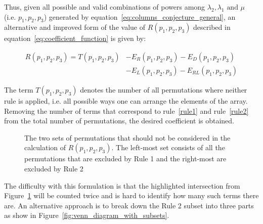 Thus, given all possible and valid combinations of powers among \(\lambda_2,
\lambda_1 \text{ and } \mu\) (i.e. \(p_1,p_2,p_3\)) generated by
equation~\eqref{eq:columns_conjecture_general}, an alternative and improved form
of the value of \(R(p_1, p_2, p_3)\) described in
equation~\eqref{eq:coefficient_function} is given by:

\begin{align}\label{eq:permutation formula}
    R(p_1, p_2, p_3) = T(p_1, p_2, p_3) & - E_R(p_1, p_2, p_3)
    - E_D(p_1, p_2, p_3) \nonumber \\
    & - E_L(p_1, p_2, p_3) - E_{RL}(p_1, p_2, p_3)
\end{align}


The term \(T(p_1,p_2,p_3)\) denotes the number of all permutations where neither
rule is applied, i.e. all possible ways one can arrange the elements of the
array.
Removing the number of terms that correspond to rule~\ref{rule1} and
rule~\ref{rule2} from the total number of permutations, the desired
coefficient is obtained.

\begin{figure}[H]
    \centering
    \caption{The two sets of permutations that should not be considered in the
    calculation of \(R(p_1, p_2, p_3)\). The left-most set consists of all the
    permutations that are excluded by Rule 1 and the right-most are excluded
    by Rule 2}
    \label{fig:venn_diagram_with_rules}
\end{figure}

The difficulty with this formulation is that the highlighted intersection from
Figure~\ref{fig:venn_diagram_with_rules} will
be counted twice and is hard to identify how many such terms there are.
An alternative approach is to break down the Rule 2 subset into three parts as
show in Figure~\ref{fig:venn_diagram_with_subsets}.


